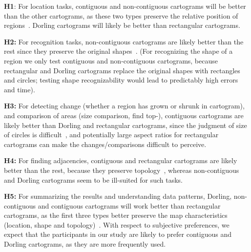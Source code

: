 \documentclass[10pt,journal,compsoc]{IEEEtran}
\begin{document}
{\bf  H1}: For location tasks, contiguous and non-contiguous cartograms will be better than the other cartograms, as these two types preserve the relative position of regions~\cite{AKV15, Olson, cartogram-star}. Dorling cartograms will likely be better than rectangular cartograms.


{\bf H2:} For recognition tasks, non-contiguous cartograms are likely better than the rest since they preserve the original shapes~\cite{Olson}. (For recognizing the shape of a region we only test contiguous and
non-contiguous cartograms, because rectangular and Dorling cartograms replace the original shapes with rectangles and circles; testing shape recognizability would lead to predictably high errors and time).

{\bf H3:} For detecting change (whether a region has grown or shrunk in cartogram), and comparison of areas (size comparison, find top-), contiguous cartograms are likely better than Dorling and rectangular cartograms, since the judgment of size of circles is difficult~\cite{teghtsoonian1965judgment}, and potentially large aspect ratios for rectangular cartograms can make the changes/comparisons difficult to perceive.
 
{\bf H4:} For finding adjacencies, contiguous and rectangular cartograms are likely better than the rest, because they preserve topology~\cite{AKV15, cartogram-star}, whereas non-contiguous and Dorling cartograms seem to be ill-suited for such tasks.

{\bf H5:} For summarizing the results and understanding data patterns, Dorling, non-contiguous and contiguous cartograms will work better than rectangular cartograms, as the first three types better preserve the map characteristics (location, shape and topology)~\cite{AKV15}.
With respect to subjective preferences, we expect that the participants in our study are likely to prefer contiguous
 and Dorling cartograms, as they are more frequently used.
\end{document}
